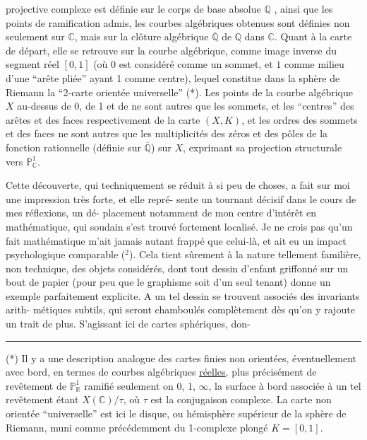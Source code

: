 
projective complexe est définie sur le corps de base absolue $\mathbb{Q}$ ,
ainsi que les points de ramification admis, les courbes algébriques
obtenues sont définies non seulement sur $\mathbb{C}$, mais sur la clôture
algébrique $\overline{\mathbb{Q}}$ de $\mathbb{Q}$ dans $\mathbb{C}$. Quant à la carte de départ, elle se
retrouve sur la courbe algébrique, comme image inverse du segment
réel $[0,1]$ (où $0$ est considéré comme un sommet, et $1$ comme
milieu d'une ``arête pliée'' ayant 1 comme centre), lequel constitue
dans la sphère de Riemann la ``2-carte orientée universelle'' (*).
Les points de la courbe algébrique $X$ au-dessus de 0, de 1 et de \unsure{\hand{$\infty$}|$\infty$}
ne sont autres que les sommets, et les ``centres'' des arêtes et des
faces respectivement de la carte $(X,K)$, et les ordres des sommets
et des faces ne sont autres que les multiplicités des zéros et
des pôles de la fonction rationnelle (définie sur $\overline{\mathbb{Q}}$) sur $X$,
exprimant sa projection structurale vers $\mathbb{P}^1_{\mathbb{C}}$.

Cette découverte, qui techniquement se réduit à si peu
de choses, a fait sur moi une impression très forte, et elle repré-%
sente un tournant décisif dans le cours de mes réflexions, un dé-%
placement notamment de mon centre d'intérêt en mathématique, qui
soudain s'est trouvé fortement localisé. Je ne crois pas qu'un
fait mathématique m'ait jamais autant frappé que celui-là, et ait
eu un impact psychologique comparable ($^2$). Cela tient sûrement à la
nature tellement familière, non technique, des objets considérés,
dont tout dessin d'enfant griffonné sur un bout de papier (pour peu
que le graphisme soit d'un seul tenant) donne un exemple parfaitement
explicite. A un tel dessin se trouvent associés des invariants arith-%
métiques subtils, qui seront chamboulés complètement dès qu'on y
rajoute un trait de plus. S'agissant ici de cartes sphériques, don-%

\noindent\rule{4cm}{0.4pt}

(*) Il y a une description analogue des cartes finies non orientées,
éventuellement avec bord, en termes de courbes algébriques \uline{réelles},
plus précisément de revêtement de $\mathbb{P}^1_{\mathbb{R}}$ ramifié seulement on 0, 1, $\infty$,
la surface à bord associée à un tel revêtement étant $X(\mathbb{C})/\tau$, où $\tau$
est la conjugaison complexe. La carte non orientée ``universelle'' est
ici le disque, ou hémisphère supérieur de la sphère de Riemann, muni
comme précédemment du 1-complexe plongé $K = [0,1]$.

